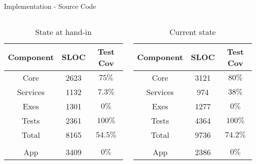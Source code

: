 \documentclass[a4paper]{beamer}
\begin{document}
\begin{frame}{Implementation - Source Code}
    \begin{columns}
        \begin{column}{0.48\textwidth}
            \begin{table}
                \centering
                \begin{tabular}{c|c|c}
                    Component & SLOC  & Test Cov\\
                    \hline
                    Core      & 2623 & $75\%$\\
                    Services  & 1132 & $7.3\%$\\
                    Exes      & 1301 & $0\%$\\
                    Tests     & 2361 & $100\%$\\
                    \hline
                    Total     & 8165 & $54.5\%$\\
                    &&\\
                    App       & 3409 & $0\%$
                \end{tabular}
                \caption{State at hand-in}
            \end{table}
        \end{column}
        \begin{column}{0.48\textwidth}
            \begin{table}
                \centering
                \begin{tabular}{c|c|c}
                    Component & SLOC  & Test Cov\\
                    \hline
                    Core      & 3121 & $80\%$\\
                    Services  &  974 & $38\%$\\
                    Exes      & 1277 & $0\%$\\
                    Tests     & 4364 & $100\%$\\
                    \hline
                    Total     & 9736 & $74.2\%$\\
                    &&\\
                    App       & 2386 & $0\%$
                \end{tabular}
                \caption{Current state}
            \end{table}
        \end{column}
    \end{columns}
\end{frame}
\end{document}
